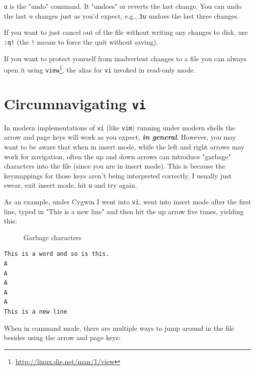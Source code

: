\documentclass[10pt,]{book}
\renewcommand{\href}[2]{#2\footnote{\url{#1}}}
\numberwithin{figure}{chapter}
\DeclareRobustCommand{\drcap}[1]{\begin{figure}[H]\caption{#1}\end{figure}}
\DeclareRobustCommand{\drcmd}[1]{\index{Commands!#1}}
\DeclareRobustCommand{\drvic}[2]{\index{vi Commands!#1 (#2)}}
\begin{document}
\texttt{u}\drvic{u}{Undo} is the "undo" command. It "undoes" or reverts
the last change. You can undo the last \emph{n} changes just as you'd
expect, e.g., \texttt{3u} undoes the last three changes.

If you want to just cancel out of the file without writing any changes
to disk, use \texttt{:q!} (the \texttt{!} means to force the quit
without saving).

If you want to protect yourself from inadvertent changes to a file you
can always open it using
\href{http://linux.die.net/man/1/view}{\texttt{view}}\drcmd{view}, the
alias for \texttt{vi} invoked in read-only mode.

\section{Circumnavigating \texttt{vi}}\label{circumnavigating-vi}

In modern implementations of \texttt{vi} (like \texttt{vim}) running
under modern shells the arrow and page keys will work as you expect,
\textbf{\emph{in general}}. However, you may want to be aware that when
in insert mode, while the left and right arrows may work for navigation,
often the up and down arrows can introduce "garbage" characters into the
file (since you are in insert mode). This is because the keymappings for
those keys aren't being interpreted correctly. I usually just swear,
exit insert mode, hit \texttt{u} and try again.

As an example, under Cygwin I went into \texttt{vi}, went into insert
mode after the first line, typed in "This is a new line" and then hit
the up arrow five times, yielding this:

\drcap{Garbage characters}

\begin{verbatim}
This is a word and so is this.
A
A
A
A
A
This is a new line
\end{verbatim}

When in command mode, there are multiple ways to jump around in the file
besides using the arrow and page keys:
\end{document}
